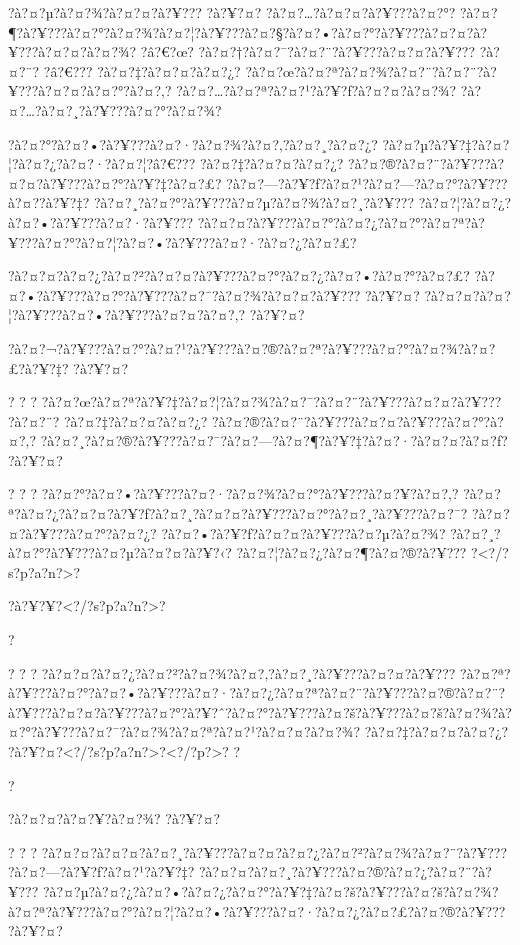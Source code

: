 \documentclass[11pt, openany]{book}
\begin{document}
{{{{{{{{{{{?à?¤?µ?à?¤?¾?à?¤?¤?à?¥??? ?à?¥?¤? ?à?¤?\ldots{}?à?¤?¤?à?¥???à?¤?°?
?à?¤?¶?à?¥???à?¤?°?à?¤?¾?à?¤?¦?à?¥???à?¤?§?à?¤?•?à?¤?°?à?¥???à?¤?¤?à?¥???à?¤?¤?à?¤?¾?
?â?€?œ? ?à?¤?†?à?¤?¯?à?¤?¨?à?¥???à?¤?¤?à?¥??? ?à?¤?¨? ?â?€???
?à?¤?‡?à?¤?¤?à?¤?¿?
?à?¤?œ?à?¤?ª?à?¤?¾?à?¤?¨?à?¤?¨?à?¥???à?¤?¤?à?¤?°?à?¤?‚?
?à?¤?\ldots{}?à?¤?ª?à?¤?¹?à?¥?ƒ?à?¤?¤?à?¤?¾?
?à?¤?\ldots{}?à?¤?¸?à?¥???à?¤?°?à?¤?¾?

?à?¤?°?à?¤?•?à?¥???à?¤?·?à?¤?¾?à?¤?‚?à?¤?¸?à?¤?¿?
?à?¤?µ?à?¥?‡?à?¤?¦?à?¤?¿?à?¤?·?à?¤?¦?â?€??? ?à?¤?‡?à?¤?¤?à?¤?¿?
?à?¤?®?à?¤?¨?à?¥???à?¤?¤?à?¥???à?¤?°?à?¥?‡?à?¤?£?
?à?¤?---?à?¥?ƒ?à?¤?¹?à?¤?---?à?¤?°?à?¥???à?¤?­?à?¥?‡?
?à?¤?¸?à?¤?°?à?¥???à?¤?µ?à?¤?¾?à?¤?¸?à?¥???
?à?¤?¦?à?¤?¿?à?¤?•?à?¥???à?¤?·?à?¥???
?à?¤?¤?à?¥???à?¤?°?à?¤?¿?à?¤?°?à?¤?ª?à?¥???à?¤?°?à?¤?¦?à?¤?•?à?¥???à?¤?·?à?¤?¿?à?¤?£?

?à?¤?¤?à?¤?¿?à?¤?²?à?¤?¤?à?¥???à?¤?°?à?¤?¿?à?¤?•?à?¤?°?à?¤?£?
?à?¤?•?à?¥???à?¤?°?à?¥???à?¤?¯?à?¤?¾?à?¤?¤?à?¥??? ?à?¥?¤?
?à?¤?¤?à?¤?¦?à?¥???à?¤?•?à?¥???à?¤?¤?à?¤?‚? ?à?¥?¤?

?à?¤?¬?à?¥???à?¤?°?à?¤?¹?à?¥???à?¤?®?à?¤?ª?à?¥???à?¤?°?à?¤?¾?à?¤?£?à?¥?‡?
?à?¥?¤?

? ? ? ?à?¤?œ?à?¤?ª?à?¥?‡?à?¤?¦?à?¤?¾?à?¤?¯?à?¤?¨?à?¥???à?¤?¤?à?¥???
?à?¤?¨? ?à?¤?‡?à?¤?¤?à?¤?¿? ?à?¤?®?à?¤?¨?à?¥???à?¤?¤?à?¥???à?¤?°?à?¤?‚?
?à?¤?¸?à?¤?®?à?¥???à?¤?¯?à?¤?---?à?¤?¶?à?¥?‡?à?¤?·?à?¤?¤?à?¤?ƒ? ?à?¥?¤?

? ? ? ?à?¤?°?à?¤?•?à?¥???à?¤?·?à?¤?¾?à?¤?°?à?¥???à?¤?¥?à?¤?‚?
?à?¤?ª?à?¤?¿?à?¤?¤?à?¥?ƒ?à?¤?¸?à?¤?¤?à?¥???à?¤?°?à?¤?¸?à?¥???à?¤?¯?
?à?¤?¤?à?¥???à?¤?°?à?¤?¿? ?à?¤?•?à?¥?ƒ?à?¤?¤?à?¥???à?¤?µ?à?¤?¾?
?à?¤?¸?à?¤?°?à?¥???à?¤?µ?à?¤?¤?à?¥?‹? ?à?¤?¦?à?¤?¿?à?¤?¶?à?¤?®?à?¥???
?\textless{}?/?s?p?a?n?\textgreater{}?

?à?¥?¥?\textless{}?/?s?p?a?n?\textgreater{}?

?

? ? ? ?à?¤?¤?à?¤?¿?à?¤?²?à?¤?¾?à?¤?‚?à?¤?¸?à?¥???à?¤?¤?à?¥???
?à?¤?ª?à?¥???à?¤?°?à?¤?•?à?¥???à?¤?·?à?¤?¿?à?¤?ª?à?¤?¨?à?¥???à?¤?®?à?¤?¨?à?¥???à?¤?¤?à?¥???à?¤?°?à?¥?ˆ?à?¤?°?à?¥???à?¤?š?à?¥???à?¤?š?à?¤?¾?à?¤?°?à?¥???à?¤?¯?à?¤?¾?à?¤?ª?à?¤?¹?à?¤?¤?à?¤?¾?
?à?¤?‡?à?¤?¤?à?¤?¿?
?à?¥?¤?\textless{}?/?s?p?a?n?\textgreater{}?\textless{}?/?p?\textgreater{}?
?

?

?à?¤?¤?à?¤?¥?à?¤?¾? ?à?¥?¤?

? ? ? ?à?¤?¤?à?¤?¤?à?¤?¸?à?¥???à?¤?¤?à?¤?¿?à?¤?²?à?¤?¾?à?¤?¨?à?¥???
?à?¤?---?à?¥?ƒ?à?¤?¹?à?¥?‡? ?à?¤?¤?à?¤?¸?à?¥???à?¤?®?à?¤?¿?à?¤?¨?à?¥???
?à?¤?µ?à?¤?¿?à?¤?•?à?¤?¿?à?¤?°?à?¥?‡?à?¤?š?à?¥???à?¤?š?à?¤?¾?à?¤?ª?à?¥???à?¤?°?à?¤?¦?à?¤?•?à?¥???à?¤?·?à?¤?¿?à?¤?£?à?¤?®?à?¥???
?à?¥?¤?

}}}}}}}}}}}
\end{document}
